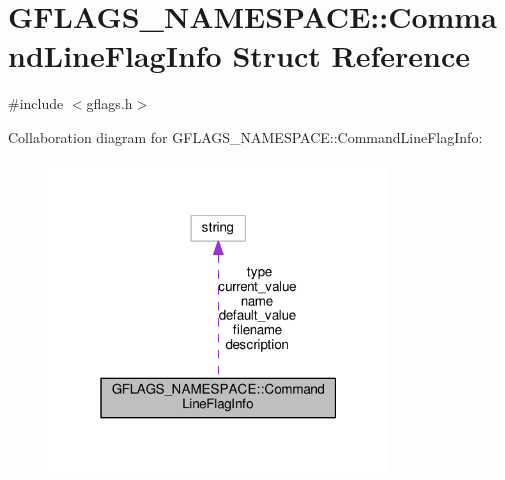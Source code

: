 \hypertarget{structGFLAGS__NAMESPACE_1_1CommandLineFlagInfo}{}\section{G\+F\+L\+A\+G\+S\+\_\+\+N\+A\+M\+E\+S\+P\+A\+CE\+:\+:Command\+Line\+Flag\+Info Struct Reference}
\label{structGFLAGS__NAMESPACE_1_1CommandLineFlagInfo}


{\ttfamily \#include $<$gflags.\+h$>$}



Collaboration diagram for G\+F\+L\+A\+G\+S\+\_\+\+N\+A\+M\+E\+S\+P\+A\+CE\+:\+:Command\+Line\+Flag\+Info\+:
\nopagebreak
\begin{figure}[H]
\begin{center}
\leavevmode
\includegraphics[width=256pt]{structGFLAGS__NAMESPACE_1_1CommandLineFlagInfo__coll__graph}
\end{center}
\end{figure}
